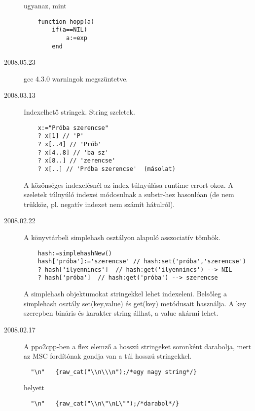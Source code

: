 \begin{description}
  ugyanaz, mint  
  
\begin{verbatim}
    function hopp(a)
        if(a==NIL)
            a:=exp
        end
\end{verbatim}


\item[2008.05.23]
  gcc 4.3.0 warningok megszüntetve.\par

\label{20080313}
\item[2008.03.13]
  Indexelhető stringek. String szeletek.
\begin{verbatim}
    x:="Próba szerencse"
    ? x[1] // 'P'
    ? x[..4] // 'Prób'
    ? x[4..8] // 'ba sz'
    ? x[8..] // 'zerencse'
    ? x[..] // 'Próba szerencse'  (másolat)
\end{verbatim}
  A közönséges indexelésnél az index túlnyúlása runtime errort okoz. 
  A szeletek túlnyúló indexei módosulnak a substr-hez hasonlóan
  (de nem trükköz, pl. negatív indexet nem számít hátulról).\par
   

\label{20080222}
\item[2008.02.22]
  A könyvtárbeli simplehash osztályon alapuló asszociatív tömbök.
\begin{verbatim}
    hash:=simplehashNew()
    hash['próba']:='szerencse' // hash:set('próba','szerencse')
    ? hash['ilyennincs']  // hash:get('ilyennincs') --> NIL
    ? hash['próba']  // hash:get('próba') --> szerencse
\end{verbatim}
  A simplehash objektumokat stringekkel lehet indexeleni.
  Belsőleg a simplehash osztály set(key,value) és get(key) metódusait
  használja.  A key szerepben bináris és karakter string állhat, 
  a value akármi lehet. \par

\item[2008.02.17]
  A ppo2cpp-ben a flex elemző a hosszú stringeket soronként darabolja,
  mert az MSC fordítónak gondja van a túl hosszú stringekkel.

\begin{verbatim}
  "\n"   {raw_cat("\\n\\\n");/*egy nagy string*/}
\end{verbatim}
  
  helyett

\begin{verbatim}
  "\n"   {raw_cat("\\n\"\nL\"");/*darabol*/}
\end{verbatim}


\end{description}
